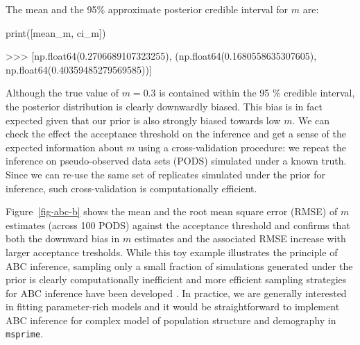 \documentclass[graybox]{svmult}
\newcommand{\msprime}[0]{\texttt{msprime}}
\begin{document}
The mean and the 95\% approximate posterior credible interval for \(m\)
are:
\begin{pythoncode}
print([mean_m, ci_m])

>>> [np.float64(0.2706689107323255), (np.float64(0.1680558635307605), np.float64(0.40359485279569585))]
\end{pythoncode}


Although the true value of \(m=0.3\) is contained within the 95 \% credible interval, the posterior distribution is clearly downwardly biased. This bias is in fact expected given that our prior is also strongly biased towards low \(m\). We can check the effect the acceptance threshold on the inference and get a sense of the expected information about \(m\) using a cross-validation procedure: we repeat the inference on pseudo-observed data sets (PODS) simulated under a known truth. Since we can re-use the same set of replicates simulated under the prior for inference, such cross-validation is computationally efficient.

Figure~\ref{fig-abc-b} shows the mean and the root mean square error (RMSE) of \(m\) estimates (across 100 PODS) against the acceptance threshold and confirms that both the downward bias in \(m\) estimates and the associated RMSE increase with larger acceptance tresholds. While this toy example illustrates the principle of ABC inference, sampling only a small fraction of simulations generated under the prior is clearly computationally inefficient and more efficient sampling strategies for ABC inference have been developed \citep{Beaumont2002}. In practice, we are generally interested in fitting parameter-rich models and it would be straightforward to implement ABC inference for complex model of population structure and demography in \msprime.
\end{document}
